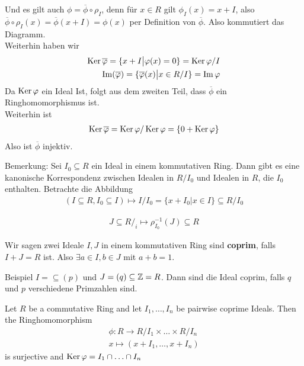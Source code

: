 Und es gilt auch $\phi = \overline{\phi} \circ \rho_I$, denn für $x \in R$ gilt $\phi_I(x) = x + I$, also $\overline{\phi} \circ \rho_I(x) = \overline{\phi}(x + I) = \phi(x)$ per Definition von $\overline{\phi}$. Also kommutiert das Diagramm.\\
Weiterhin haben wir
\begin{align*}
	\operatorname{Ker} \overline{\varphi} = \{x + I \big\vert \varphi(x) = 0\} = \operatorname{Ker} \varphi/I\\
	\operatorname{Im}(\overline{\varphi}) = \{\overline{\varphi}(x) \big\vert x \in R/I\} = \operatorname{Im} \varphi
\end{align*}
Da $\operatorname{Ker} \varphi$ ein Ideal Ist, folgt aus dem zweiten Teil, dass $\overline{\phi}$ ein Ringhomomorphismus ist.\\
Weiterhin ist
\begin{align*}
	\operatorname{Ker} \overline{\varphi} = \operatorname{Ker} \varphi/ \operatorname{Ker} \varphi = \{0 + \operatorname{Ker} \varphi\}
\end{align*}
Also ist $\overline{\phi}$ injektiv. 


Bemerkung: Sei $I_0 \subseteq R$ ein Ideal in einem kommutativen Ring. Dann gibt es eine kanonische Korrespondenz zwischen Idealen in $R/I_0$ und Idealen in $R$, die $I_0$ enthalten. Betrachte die Abbildung
\begin{align*}
	(I \subseteq R, I_0 \subseteq I) \mapsto I/I_0 = \{x + I_0 \big\vert x \in I\} \subseteq R/I_0
\end{align*}

\begin{align*}
	J \subseteq R/_i \mapsto \rho_{I_0}^{-1}(J) \subseteq R
\end{align*}


\begin{definition}[]
Wir sagen zwei Ideale $I,J$ in einem kommutativen Ring sind \textbf{coprim}, falls $I + J = R$ ist. Also $\exists a \in I, b \in J$ mit $a + b = 1$.
\end{definition}

Beispiel $I = \subseteq(p)$ und $J = (q) \subseteq \mathbb{Z} = R$. Dann sind die Ideal coprim, falls $q$ und $p$ verschiedene Primzahlen sind.


\begin{nproposition}
Let $R$ be a commutative Ring and let $I_1, \ldots, I_n$ be pairwise coprime Ideals. Then the Ringhomomorphism 
\begin{align*}
\phi: R \to R/I_1 \times \ldots \times R/I_n\\
x \mapsto (x + I_1, \ldots, x + I_n)
\end{align*}
is surjective and $\operatorname{Ker} \varphi = I_1 \cap \ldots \cap I_n$
\end{nproposition}


